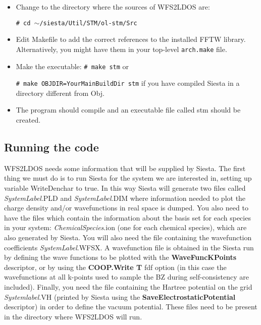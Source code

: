   \begin{itemize}

   \item Change to the directory where the sources of {\sc WFS2LDOS} are:

         {\tt \# cd $\sim$/siesta/Util/STM/ol-stm/Src}

   \item Edit Makefile to add the correct references to the installed
     FFTW library. Alternatively, you might have them in your top-level
     \texttt{arch.make} file.

   \item Make the executable:
         {\tt \# make stm} or
     
         {\tt \# make OBJDIR=YourMainBuildDir stm} if you have
         compiled Siesta in a directory different from Obj.

   \item The program should compile and an executable file called
         stm should be created.

  \end{itemize}

\subsection{Running the code}

 {\sc WFS2LDOS} needs some information that will be supplied by {\sc Siesta}. 
 The first thing we must do is to run {\sc Siesta} for 
 the system we are interested in,
 setting up variable WriteDenchar to true. 
 In this way {\sc Siesta} will generate
 two files called {\it SystemLabel}.PLD and {\it SystemLabel}.DIM
 where information 
 needed to plot the charge density and/or wavefunctions 
 in real space is dumped. You also need to have the files which
 contain the information about the basis set for each species
 in your system: {\it ChemicalSpecies}.ion (one for each
 chemical species), which
 are also generated by  {\sc Siesta}.
 You will also need the file containing the
 wavefunction coefficients {\it SystemLabel}.WFSX. 
 A wavefunction file is obtained
 in the {\sc Siesta} run by defining the wave functions to be
 plotted with the {\bf WaveFuncKPoints} descriptor, or by using the
 {\bf COOP.Write T} fdf option (in this case the
 wavefunctions at all k-points used to sample the BZ during
 self-consistency are included).
 Finally, you need the file containing the Hartree potential on the grid 
 {\it Systemlabel}.VH (printed by {\sc Siesta} using the 
 {\bf SaveElectrostaticPotential} descriptor)
 in order to define the vacuum potential. 
 These files need to be present in the
 directory where {\sc WFS2LDOS} will run.

